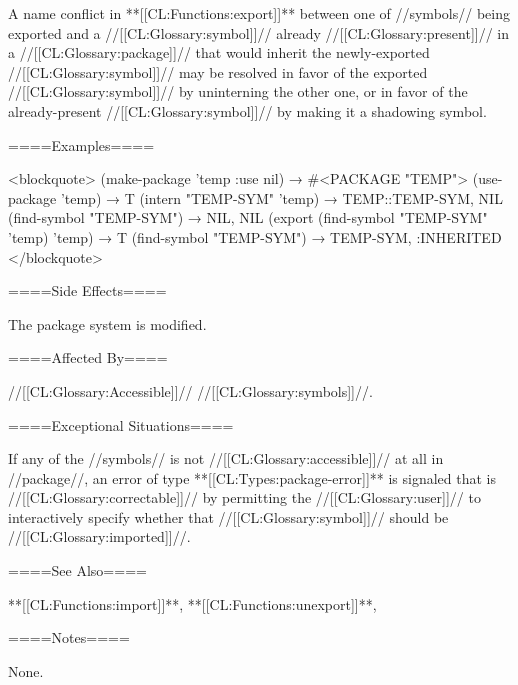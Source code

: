 A name conflict in **[[CL:Functions:export]]** between one of //symbols// being exported and a //[[CL:Glossary:symbol]]// already //[[CL:Glossary:present]]// in a //[[CL:Glossary:package]]// that would inherit the newly-exported //[[CL:Glossary:symbol]]// may be resolved in favor of the exported //[[CL:Glossary:symbol]]// by uninterning the other one, or in favor of the already-present //[[CL:Glossary:symbol]]// by making it a shadowing symbol.

====Examples====

<blockquote> (make-package 'temp :use nil) → #<PACKAGE "TEMP"> (use-package 'temp) → T (intern "TEMP-SYM" 'temp) → TEMP::TEMP-SYM, NIL (find-symbol "TEMP-SYM") → NIL, NIL (export (find-symbol "TEMP-SYM" 'temp) 'temp) → T (find-symbol "TEMP-SYM") → TEMP-SYM, :INHERITED </blockquote>

====Side Effects====

The package system is modified.

====Affected By====

//[[CL:Glossary:Accessible]]// //[[CL:Glossary:symbols]]//.

====Exceptional Situations====

If any of the //symbols// is not //[[CL:Glossary:accessible]]// at all in //package//, an error of type **[[CL:Types:package-error]]** is signaled that is //[[CL:Glossary:correctable]]// by permitting the //[[CL:Glossary:user]]// to interactively specify whether that //[[CL:Glossary:symbol]]// should be //[[CL:Glossary:imported]]//.

====See Also====

**[[CL:Functions:import]]**, **[[CL:Functions:unexport]]**, {\secref\PackageConcepts}

====Notes====

None.

